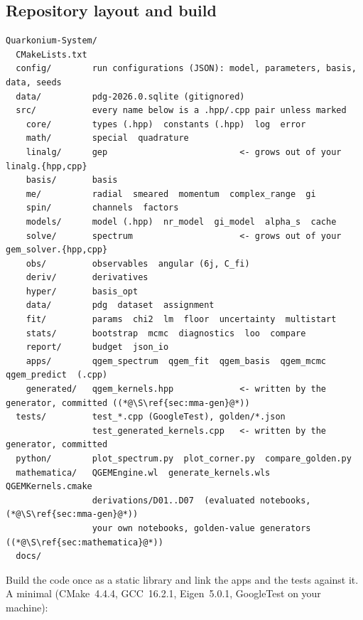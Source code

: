 \documentclass[11pt,a4paper]{article}
\numberwithin{equation}{section}
\theoremstyle{definition}
\theoremstyle{plain}
\theoremstyle{remark}
\numberwithin{algorithm}{section}
\begin{document}
\subsection{Repository layout and build}\label{sec:bp-layout}
\begin{lstlisting}[style=plain]
Quarkonium-System/
  CMakeLists.txt
  config/        run configurations (JSON): model, parameters, basis, data, seeds
  data/          pdg-2026.0.sqlite (gitignored)
  src/           every name below is a .hpp/.cpp pair unless marked
    core/        types (.hpp)  constants (.hpp)  log  error
    math/        special  quadrature
    linalg/      gep                          <- grows out of your linalg.{hpp,cpp}
    basis/       basis
    me/          radial  smeared  momentum  complex_range  gi
    spin/        channels  factors
    models/      model (.hpp)  nr_model  gi_model  alpha_s  cache
    solve/       spectrum                     <- grows out of your gem_solver.{hpp,cpp}
    obs/         observables  angular (6j, C_fi)
    deriv/       derivatives
    hyper/       basis_opt
    data/        pdg  dataset  assignment
    fit/         params  chi2  lm  floor  uncertainty  multistart
    stats/       bootstrap  mcmc  diagnostics  loo  compare
    report/      budget  json_io
    apps/        qgem_spectrum  qgem_fit  qgem_basis  qgem_mcmc  qgem_predict  (.cpp)
    generated/   qgem_kernels.hpp             <- written by the generator, committed ((*@\S\ref{sec:mma-gen}@*))
  tests/         test_*.cpp (GoogleTest), golden/*.json
                 test_generated_kernels.cpp   <- written by the generator, committed
  python/        plot_spectrum.py  plot_corner.py  compare_golden.py
  mathematica/   QGEMEngine.wl  generate_kernels.wls  QGEMKernels.cmake
                 derivations/D01..D07  (evaluated notebooks, (*@\S\ref{sec:mma-gen}@*))
                 your own notebooks, golden-value generators ((*@\S\ref{sec:mathematica}@*))
  docs/
\end{lstlisting}
Build the code once as a static library  and link the apps and the tests against it. A minimal  (CMake~4.4.4, GCC~16.2.1, Eigen~5.0.1, GoogleTest on your machine):
\end{document}
